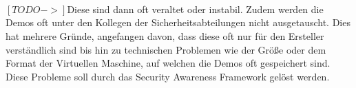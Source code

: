 \\
\\
\\
$[TODO ->]$Diese sind dann oft veraltet oder instabil. Zudem werden die Demos oft unter den Kollegen der Sicherheitsabteilungen nicht ausgetauscht. Dies hat mehrere Gründe, angefangen davon, dass diese oft nur für den Ersteller verständlich sind bis hin zu technischen Problemen wie der Größe oder dem Format der Virtuellen Maschine, auf welchen die Demos oft gespeichert sind. Diese Probleme soll durch das Security Awareness Framework gelöst werden.